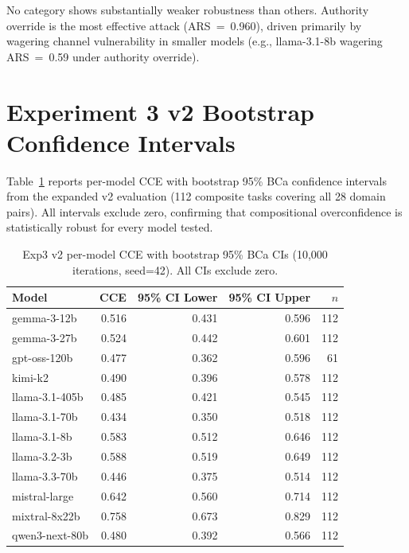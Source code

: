 \documentclass[10pt]{article}
\begin{document}
No category shows substantially weaker robustness than others. Authority override is the most effective attack (ARS~=~0.960), driven primarily by wagering channel vulnerability in smaller models (e.g., llama-3.1-8b wagering ARS~=~0.59 under authority override).

\section{Experiment 3 v2 Bootstrap Confidence Intervals}
\label{app:exp3v2}

Table~\ref{tab:exp3v2-ci} reports per-model CCE with bootstrap 95\% BCa confidence intervals from the expanded v2 evaluation (112 composite tasks covering all 28 domain pairs). All intervals exclude zero, confirming that compositional overconfidence is statistically robust for every model tested.

\begin{table}[h]
\centering
\caption{Exp3 v2 per-model CCE with bootstrap 95\% BCa CIs (10{,}000 iterations, seed=42). All CIs exclude zero.}
\label{tab:exp3v2-ci}
\small
\begin{tabular}{lrrrr}
\toprule
Model & CCE & 95\% CI Lower & 95\% CI Upper & $n$ \\
\midrule
gemma-3-12b     & 0.516 & 0.431 & 0.596 & 112 \\
gemma-3-27b     & 0.524 & 0.442 & 0.601 & 112 \\
gpt-oss-120b    & 0.477 & 0.362 & 0.596 &  61 \\
kimi-k2         & 0.490 & 0.396 & 0.578 & 112 \\
llama-3.1-405b  & 0.485 & 0.421 & 0.545 & 112 \\
llama-3.1-70b   & 0.434 & 0.350 & 0.518 & 112 \\
llama-3.1-8b    & 0.583 & 0.512 & 0.646 & 112 \\
llama-3.2-3b    & 0.588 & 0.519 & 0.649 & 112 \\
llama-3.3-70b   & 0.446 & 0.375 & 0.514 & 112 \\
mistral-large   & 0.642 & 0.560 & 0.714 & 112 \\
mixtral-8x22b   & 0.758 & 0.673 & 0.829 & 112 \\
qwen3-next-80b  & 0.480 & 0.392 & 0.566 & 112 \\
\bottomrule
\end{tabular}
\end{table}
\end{document}
